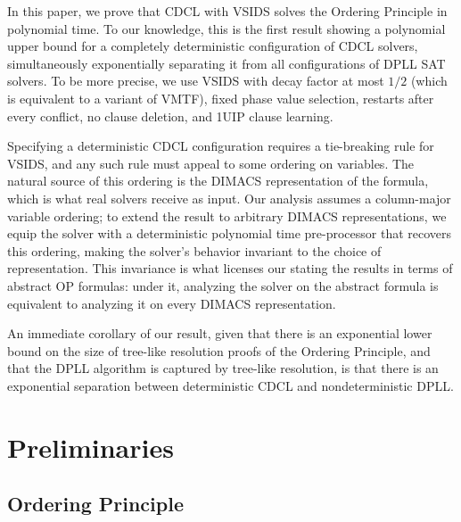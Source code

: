 \documentclass[a4paper,UKenglish,cleveref, autoref, thm-restate]{lipics-v2021}
\begin{document}
In this paper, we prove that CDCL with VSIDS solves the Ordering Principle in polynomial time. To our knowledge, this is the first result showing a polynomial upper bound for a completely deterministic configuration of CDCL solvers, simultaneously exponentially separating it from all configurations of DPLL SAT solvers. To be more precise, we use VSIDS with decay factor at most $1/2$ (which is equivalent to a variant of VMTF), fixed phase value selection, restarts after every conflict, no clause deletion, and 1UIP clause learning. 

Specifying a deterministic CDCL configuration requires a tie-breaking rule for VSIDS, and any such rule must appeal to some ordering on variables. The natural source of this ordering is the DIMACS representation of the formula, which is what real solvers receive as input. Our analysis assumes a column-major variable ordering; to extend the result to arbitrary DIMACS representations, we equip the solver with a deterministic polynomial time pre-processor that recovers this ordering, making the solver's behavior invariant to the choice of representation. This invariance is what licenses our stating the results in terms of abstract OP formulas: under it, analyzing the solver on the abstract formula is equivalent to analyzing it on every DIMACS representation.

An immediate corollary of our result, given that there is an exponential lower bound on the size of tree-like resolution proofs of the Ordering Principle, and that the DPLL algorithm is captured by tree-like resolution, is that there is an exponential separation between deterministic CDCL and nondeterministic DPLL.
\section{Preliminaries}

\subsection{Ordering Principle}
\end{document}
